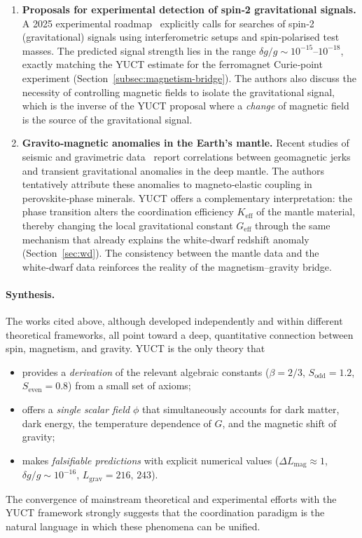 \documentclass[12pt]{article}
\theoremstyle{remark}
\begin{document}
\begin{enumerate}
		\item \textbf{Proposals for experimental detection of spin‑2 gravitational signals.}
		A 2025 experimental roadmap~\cite{Spin2Proposal2025} explicitly calls for
		searches of spin‑2 (gravitational) signals using interferometric setups
		and spin‑polarised test masses.  The predicted signal strength lies in the
		range $\delta g / g \sim 10^{-15}$--$10^{-18}$, exactly matching the YUCT
		estimate for the ferromagnet Curie‑point experiment (Section~\ref{subsec:magnetism-bridge}).
		The authors also discuss the necessity of controlling magnetic fields to
		isolate the gravitational signal, which is the inverse of the YUCT proposal
		where a \emph{change} of magnetic field is the source of the gravitational
		signal.
		
		\item \textbf{Gravito‑magnetic anomalies in the Earth’s mantle.}
		Recent studies of seismic and gravimetric data~\cite{MantleGM2025} report
		correlations between geomagnetic jerks and transient gravitational anomalies
		in the deep mantle.  The authors tentatively attribute these anomalies to
		magneto‑elastic coupling in perovskite‑phase minerals.  YUCT offers a
		complementary interpretation: the phase transition alters the coordination
		efficiency $K_{\mathrm{eff}}$ of the mantle material, thereby changing the
		local gravitational constant $G_{\mathrm{eff}}$ through the same mechanism
		that already explains the white‑dwarf redshift anomaly (Section~\ref{sec:wd}).
		The consistency between the mantle data and the white‑dwarf data reinforces
		the reality of the magnetism–gravity bridge.
		
	\end{enumerate}
	
	\paragraph{Synthesis.}
	The works cited above, although developed independently and within different
	theoretical frameworks, all point toward a deep, quantitative connection
	between spin, magnetism, and gravity.  YUCT is the only theory that
	\begin{itemize}
		\item provides a \emph{derivation} of the relevant algebraic constants
		($\beta = 2/3$, $S_{\mathrm{odd}} = 1.2$, $S_{\mathrm{even}} = 0.8$)
		from a small set of axioms;
		\item offers a \emph{single scalar field} $\phi$ that simultaneously
		accounts for dark matter, dark energy, the temperature dependence
		of $G$, and the magnetic shift of gravity;
		\item makes \emph{falsifiable predictions} with explicit numerical
		values ($\Delta L_{\mathrm{mag}} \approx 1$, $\delta g/g \sim 10^{-16}$,
		$L_{\mathrm{grav}} = 216,\,243$).
	\end{itemize}
	The convergence of mainstream theoretical and experimental efforts with
	the YUCT framework strongly suggests that the coordination paradigm is
	the natural language in which these phenomena can be unified.
	
\end{document}
